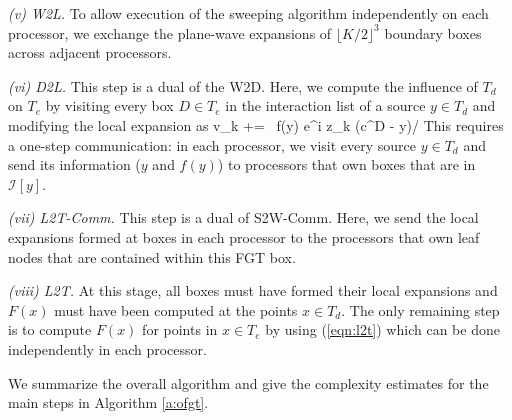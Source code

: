 {\em (v) W2L.} To allow execution of the sweeping algorithm independently on each processor, we exchange the plane-wave expansions of $\lfloor K/2 \rfloor ^3$ boundary boxes across adjacent processors. 


{\em (vi) D2L.} This step is a dual of the W2D. Here, we compute the influence of $T_d$ on $T_e$ by visiting every box $D \in T_e$ in the interaction list of a source $y \in T_d$ and modifying the local expansion as 
%
\beq v_k += \, f(y) e^{i z_k \cdot (c^D - y)/\sqrt{\delta}} \eeq
%
This requires a one-step communication: in each processor, we visit every source $y \in T_d$ 
and send its information ($y$ and $f(y)$) to processors that own boxes that are in $\mathcal{I}[y]$.

{\em (vii) L2T-Comm.} This step is a dual of S2W-Comm. Here, we send the local expansions formed at boxes in each processor 
to the processors that own leaf nodes that are contained within this FGT box. 


{\em (viii) L2T.} At this stage, all boxes must have formed their local expansions and $F(x)$ must have been computed at
 the points $x \in T_d$. The only remaining step is to compute $F(x)$ for points in $x \in T_e$ by using (\ref{eqn:l2t}) 
 which can be done independently in each processor. 

We summarize the overall algorithm and give the complexity estimates for the main steps in Algorithm \ref{a:ofgt}.  

